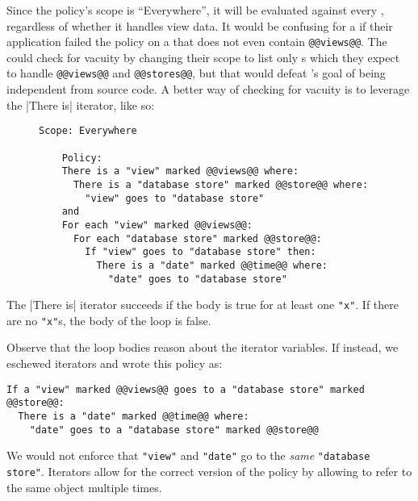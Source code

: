 Since the policy's scope is ``Everywhere'', it will be evaluated against every \controller{},
regardless of whether it handles view data.
%
It would be confusing for a \dev{} if their application failed the policy on a \controller{} 
that does not even contain \lstinline[language=CNL]|@@views@@|.
%
The \ce{} could check for vacuity by changing their scope to list only \controller{}s which they expect to handle 
\lstinline[language=CNL]|@@views@@| and \lstinline[language=CNL]|@@stores@@|,
but that would defeat \syslang's goal of being independent from source code.
%
A better way of checking for vacuity is to leverage the |There is| iterator, like so:
\begin{figure}
  \begin{lstlisting}[language=CNL]
    Scope: Everywhere
    
    Policy:
    There is a "view" marked @@views@@ where:
      There is a "database store" marked @@store@@ where:
        "view" goes to "database store"
    and
    For each "view" marked @@views@@:
      For each "database store" marked @@store@@:
        If "view" goes to "database store" then:
          There is a "date" marked @@time@@ where:
            "date" goes to "database store"
  \end{lstlisting}
  \label{f:vacuity}
\end{figure}
%
The |There is| iterator succeeds if the body is true for at least one \lstinline[language=CNL]|"x"|.
%
If there are no \lstinline[language=CNL]|"x"|s, the body of the loop is false.

Observe that the loop bodies reason about the iterator variables.
%
If instead, we eschewed iterators and wrote this policy as:
\begin{lstlisting}[language=CNL]
If a "view" marked @@views@@ goes to a "database store" marked @@store@@:
  There is a "date" marked @@time@@ where:
    "date" goes to a "database store" marked @@store@@
\end{lstlisting}
We would not enforce that \lstinline[language=CNL]|"view"| and \lstinline[language=CNL]|"date"| 
go to the \emph{same} \lstinline[language=CNL]|"database store"|.
%
Iterators allow for the correct version of the policy by allowing \ces{} to refer to the same object multiple times.

